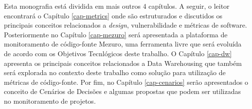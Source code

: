 Esta monografia está dividida em mais outros 4 capítulos. A seguir, o leitor encontrará o Capítulo \ref{cap-metrics} onde são estruturados e discutidos os principais conceitos relacionados a \emph{design}, vulnerabilidade e métricas de software. Posteriormente no Capítulo \ref{cap-mezuro} será apresentada a plataforma de monitoramento de código-fonte Mezuro, uma ferramenta livre que será evoluída de acordo com os Objetivos Tecnlógicos deste trabalho. O Capítulo \ref{cap-dw} apresenta os principais conceitos relacionados a Data Warehousing que também será explorada no contexto deste trabalho como solução para utilização de métricas de código-fonte. Por fim, no Capítulo \ref{cap-cenarios} serão apresentados o conceito de Cenários de Decisões e algumas propostas que podem ser utilizadas no monitoramento de projetos.